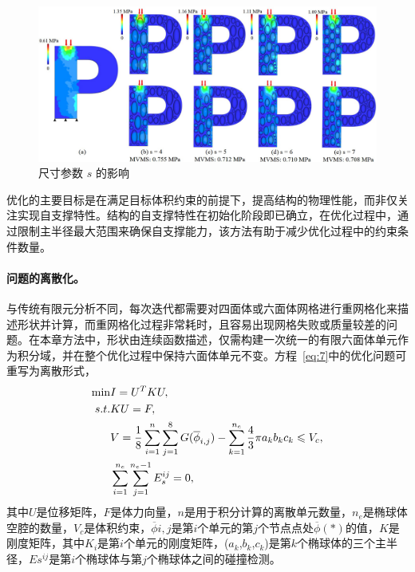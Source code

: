 \begin{figure}[htbp]
  \centering
  \includegraphics[width=1.0 \textwidth]{./figures/self-support/fig7.png}
  \caption{尺寸参数 $s$ 的影响}
  \label{fig:6}
\end{figure}
优化的主要目标是在满足目标体积约束的前提下，提高结构的物理性能，而非仅关注实现自支撑特性。结构的自支撑特性在初始化阶段即已确立，在优化过程中，通过限制主半径最大范围来确保自支撑能力，该方法有助于减少优化过程中的约束条件数量。

\paragraph{问题的离散化。}
与传统有限元分析不同，每次迭代都需要对四面体或六面体网格进行重网格化来描述形状并计算，而重网格化过程非常耗时，且容易出现网格失败或质量较差的问题。在本章方法中，形状由连续函数描述，仅需构建一次统一的有限六面体单元作为积分域，并在整个优化过程中保持六面体单元不变。方程~\ref{eq:7}中的优化问题可重写为离散形式，
\begin{equation}
\centering
    \begin{split}
        \min \quad & I = U^{T} K U,   \\
        s.t. \quad & K U = F,       \\
        &V = \frac{1}{8}\sum _{i=1}^{n} \sum _{j=1}^{8}G(\overline{\phi}_{i,j})- \sum _{k=1}^{n_{e}} \frac{4}{3} \pi a_{k} b_{k} c_{k} \leq V_{c}, \\
        &\sum _{i=1}^{n_{e}} \sum _{j=1}^{n_{e}-1}E_{s}^{ij}=0, 
    \end{split}
    \label{eq:9}
\end{equation}
其中$U$是位移矩阵，$F$是体力向量，$n$是用于积分计算的离散单元数量，$n_{e}$是椭球体空腔的数量，$V_{c}$是体积约束，$\overline{\phi}{i,j}$是第$i$个单元的第$j$个节点点处$\overline{\phi}(*)$的值，$K$是刚度矩阵，其中$K_i$是第$i$个单元的刚度矩阵，($a_k$,$b_k$,$c_k$)是第$k$个椭球体的三个主半径，$E{s}^{ij}$是第$i$个椭球体与第$j$个椭球体之间的碰撞检测。

